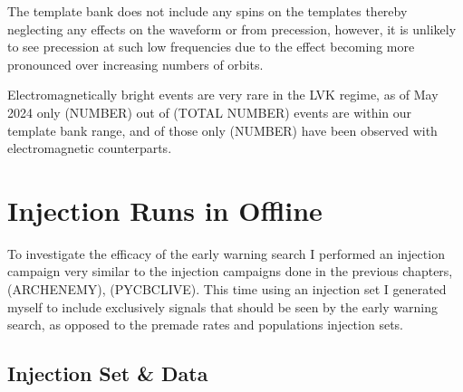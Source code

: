 The template bank does not include any spins on the templates thereby neglecting any effects on the waveform or from precession, however, it is unlikely to see precession at such low frequencies due to the effect becoming more pronounced over increasing numbers of orbits.

Electromagnetically bright events are very rare in the LVK regime, as of May 2024 only (NUMBER) out of (TOTAL NUMBER) events are within our template bank range, and of those only (NUMBER) have been observed with electromagnetic counterparts.

\section{Injection Runs in Offline}

To investigate the efficacy of the early warning search I performed an injection campaign very similar to the injection campaigns done in the previous chapters, (ARCHENEMY), (PYCBCLIVE). This time using an injection set I generated myself to include exclusively signals that should be seen by the early warning search, as opposed to the premade rates and populations injection sets.

\subsection{Injection Set \& Data}

